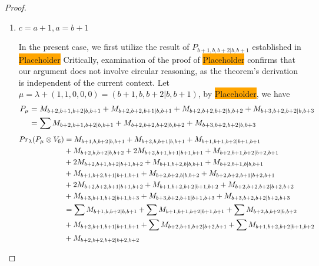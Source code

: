 \begin{proof}
\begin{enumerate}
\begin{enumerate}
        \item $c=a+1,a=b+1$ \par
        In the present case, we first utilize the result of $P_{b+1,b,b+2|b,b+1}$ established in \colorbox{orange}{Placeholder} Critically, examination of the proof of \colorbox{orange}{Placeholder} confirms that our argument does not involve circular reasoning, as the theorem's derivation is independent of the current context. Let $\mu = \lambda + (1,1,0,0,0) =(b+1,b,b+2|b,b+1) $, by \colorbox{orange}{Placeholder}, we have
        \begin{equation}\notag
          \begin{aligned}
            P_\mu &= 
M_{b+2,b+1,b+2|b,b+1}
+M_{b+2,b+2,b+1|b,b+1}
+M_{b+2,b+2,b+2|b,b+2}
+M_{b+3,b+2,b+2|b,b+3} \\
                  &=
\sum M_{b+2,b+1,b+2|b,b+1}
+ M_{b+2,b+2,b+2|b,b+2}
+ M_{b+3,b+2,b+2|b,b+3}
          \end{aligned}
        \end{equation}
        \begin{equation}\notag
          \begin{aligned}
            Pr_{\lambda}(P_\mu \otimes V_{6}) &=
M_{b+1,b,b+2|b,b+1}
+ M_{b+2,b,b+1|b,b+1}
+ M_{b+1,b+1,b+2|b+1,b+1}\\
                                              &
+ M_{b+2,b,b+2|b,b+2}
+ 2M_{b+2,b+1,b+1|b+1,b+1}
+ M_{b+2,b+1,b+2|b+2,b+1}\\
                                              &
+ 2M_{b+2,b+1,b+2|b+1,b+2}
+ M_{b+1,b+2,b|b,b+1}
+ M_{b+2,b+1,b|b,b+1}\\
                                              &
+ M_{b+1,b+2,b+1|b+1,b+1}
+ M_{b+2,b+2,b|b,b+2}
+ M_{b+2,b+2,b+1|b+2,b+1}\\
                                              &
+ 2M_{b+2,b+2,b+1|b+1,b+2}
+ M_{b+1,b+2,b+2|b+1,b+2}
+ M_{b+2,b+2,b+2|b+2,b+2}\\
                                              &
+ M_{b+3,b+1,b+2|b+1,b+3}
+ M_{b+3,b+2,b+1|b+1,b+3}
+ M_{b+3,b+2,b+2|b+2,b+3} \\
                                               &=
\sum M_{b+1,b,b+2|b,b+1}
+ \sum M_{b+1,b+1,b+2|b+1,b+1}
+ \sum M_{b+2,b,b+2|b,b+2}\\
                                              &
+  M_{b+2,b+1,b+1|b+1,b+1}
+ \sum M_{b+2,b+1,b+2|b+2,b+1}
+ \sum M_{b+1,b+2,b+2|b+1,b+2}\\
                                              &
+  M_{b+2,b+2,b+2|b+2,b+2}

\end{aligned}
\end{equation}
\end{enumerate}
\end{enumerate}
\end{proof}
